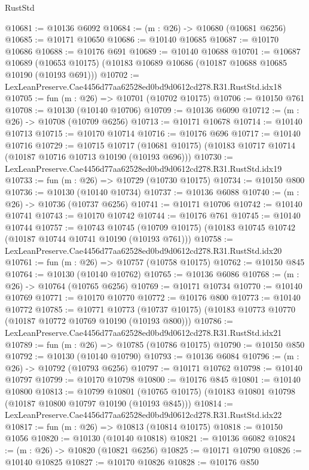 \begin{lexlean}{RustStd}
\begin{coremodule}
@10681 := @10136 @6092
@10684 := (m : @26) -> @10680 (@10681 @6256)
@10685 := @10171 @10650
@10686 := @10140 @10685
@10687 := @10170 @10686
@10688 := @10176 @691
@10689 := @10140 @10688
@10701 := @10687
    @10689
    (@10653 @10175)
    (@10183 @10689 @10686 (@10187 @10688 @10685 @10190 (@10193 @691)))
@10702 := LexLeanPreserve.Cae4456d77aa62528ed0bd9d0612cd278.R31.RustStd.idx18
@10705 := fun (m : @26) => @10701 (@10702 @10175)
@10706 := @10150 @761
@10708 := @10130 (@10140 @10706)
@10709 := @10136 @6090
@10712 := (m : @26) -> @10708 (@10709 @6256)
@10713 := @10171 @10678
@10714 := @10140 @10713
@10715 := @10170 @10714
@10716 := @10176 @696
@10717 := @10140 @10716
@10729 := @10715
    @10717
    (@10681 @10175)
    (@10183 @10717 @10714 (@10187 @10716 @10713 @10190 (@10193 @696)))
@10730 := LexLeanPreserve.Cae4456d77aa62528ed0bd9d0612cd278.R31.RustStd.idx19
@10733 := fun (m : @26) => @10729 (@10730 @10175)
@10734 := @10150 @800
@10736 := @10130 (@10140 @10734)
@10737 := @10136 @6088
@10740 := (m : @26) -> @10736 (@10737 @6256)
@10741 := @10171 @10706
@10742 := @10140 @10741
@10743 := @10170 @10742
@10744 := @10176 @761
@10745 := @10140 @10744
@10757 := @10743
    @10745
    (@10709 @10175)
    (@10183 @10745 @10742 (@10187 @10744 @10741 @10190 (@10193 @761)))
@10758 := LexLeanPreserve.Cae4456d77aa62528ed0bd9d0612cd278.R31.RustStd.idx20
@10761 := fun (m : @26) => @10757 (@10758 @10175)
@10762 := @10150 @845
@10764 := @10130 (@10140 @10762)
@10765 := @10136 @6086
@10768 := (m : @26) -> @10764 (@10765 @6256)
@10769 := @10171 @10734
@10770 := @10140 @10769
@10771 := @10170 @10770
@10772 := @10176 @800
@10773 := @10140 @10772
@10785 := @10771
    @10773
    (@10737 @10175)
    (@10183 @10773 @10770 (@10187 @10772 @10769 @10190 (@10193 @800)))
@10786 := LexLeanPreserve.Cae4456d77aa62528ed0bd9d0612cd278.R31.RustStd.idx21
@10789 := fun (m : @26) => @10785 (@10786 @10175)
@10790 := @10150 @850
@10792 := @10130 (@10140 @10790)
@10793 := @10136 @6084
@10796 := (m : @26) -> @10792 (@10793 @6256)
@10797 := @10171 @10762
@10798 := @10140 @10797
@10799 := @10170 @10798
@10800 := @10176 @845
@10801 := @10140 @10800
@10813 := @10799
    @10801
    (@10765 @10175)
    (@10183 @10801 @10798 (@10187 @10800 @10797 @10190 (@10193 @845)))
@10814 := LexLeanPreserve.Cae4456d77aa62528ed0bd9d0612cd278.R31.RustStd.idx22
@10817 := fun (m : @26) => @10813 (@10814 @10175)
@10818 := @10150 @1056
@10820 := @10130 (@10140 @10818)
@10821 := @10136 @6082
@10824 := (m : @26) -> @10820 (@10821 @6256)
@10825 := @10171 @10790
@10826 := @10140 @10825
@10827 := @10170 @10826
@10828 := @10176 @850

\end{coremodule}
\end{lexlean}
